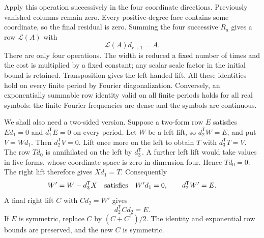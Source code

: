 Apply this operation successively in the four coordinate
directions. Previously vanished columns remain zero. Every
positive-degree face contains some coordinate, so the final
residual is zero. Summing the four successive $R_a$ gives a
row $\mathcal L(A)$ with
\[
                         \mathcal L(A)d_{r+1}=A.
\]
There are only four operations. The width is reduced a fixed
number of times and the cost is multiplied by a fixed constant;
any scalar scale factor in the initial bound is retained.
Transposition gives the left-handed lift. All these identities
hold on every finite period by Fourier diagonalization.
Conversely, an exponentially summable row identity valid on all
finite periods holds for all real symbols: the finite Fourier
frequencies are dense and the symbols are continuous.

We shall also need a two-sided version. Suppose a two-form row
$E$ satisfies $Ed_1=0$ and $d_1^{\mathsf T}E=0$ on every
period. Let $W$ be a left lift, so $d_2^{\mathsf T}W=E$,
and put $V=Wd_1$. Then $d_2^{\mathsf T}V=0$. Lift once more
on the left to obtain $T$ with $d_3^{\mathsf T}T=V$.
The row $Td_0$ is annihilated on the left by $d_3^{\mathsf T}$.
A further left lift would take values in five-forms, whose
coordinate space is zero in dimension four. Hence $Td_0=0$.
The right lift therefore gives $X d_1=T$. Consequently
\[
       W'=W-d_3^{\mathsf T}X
       \quad\hbox{satisfies}\quad
       W'd_1=0,\qquad d_2^{\mathsf T}W'=E.
\]
A final right lift $C$ with $Cd_2=W'$ gives
\begin{equation}\label{eq:curvature-double-lift}
                         d_2^{\mathsf T}Cd_2=E.
\end{equation}
If $E$ is symmetric, replace $C$ by
$(C+C^{\mathsf T})/2$. The identity and exponential row bounds
are preserved, and the new $C$ is symmetric.

